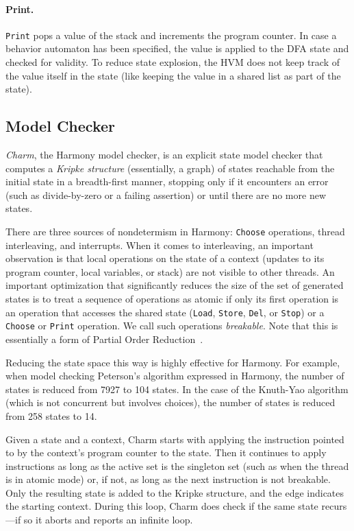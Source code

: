 \documentclass[twocolumn]{article}
\begin{document}
\paragraph{Print.}  \texttt{Print} pops a value of the stack and increments
the program counter.  In case a behavior automaton has been specified, the
value is applied to the DFA state and checked for validity.
To reduce state explosion, the HVM does not keep track of the value itself
in the state (like keeping the value in a shared list as part of the state).

\subsection{Model Checker}

\emph{Charm}, the Harmony model checker, is an explicit state model
checker that computes a \emph{Kripke structure} (essentially, a graph)
of states reachable
from the initial state in a breadth-first manner, stopping only if
it encounters an error (such as divide-by-zero or a failing assertion)
or until there are no more new states.

There are three sources of nondetermism in Harmony: \texttt{Choose}
operations, thread interleaving, and interrupts.
When it comes to interleaving, an important observation is that
local operations on the state of a context (updates to its program
counter, local variables, or stack) are not visible to other threads.
An important optimization that significantly
reduces the size of the set of generated states is to treat a
sequence of operations as atomic if only its first operation is an
operation that accesses the shared state (\texttt{Load}, \texttt{Store},
\texttt{Del}, or \texttt{Stop}) or a \texttt{Choose} or \texttt{Print}
operation.  We call such operations \emph{breakable}.
Note that this is essentially a form of Partial Order Reduction~\cite{Val91}.

Reducing the state space this way is highly effective for Harmony.
For example, when model checking Peterson's algorithm expressed in
Harmony, the number of states is reduced from 7927 to 104 states.
In the case of the Knuth-Yao algorithm (which is not concurrent but
involves choices), the number of states is reduced from 258 states
to 14.

Given a state and a context, Charm starts with applying the instruction
pointed to by the context's program counter to the state.
Then it continues to apply instructions as long as
the active set is the singleton set (such as when the thread is in
atomic mode) or, if not, as long as the next instruction is not
breakable.  Only the resulting state is added to the Kripke structure,
and the edge indicates the starting context.  During this loop, Charm
does check if the same state recurs---if so it aborts
and reports an infinite loop.
\end{document}
